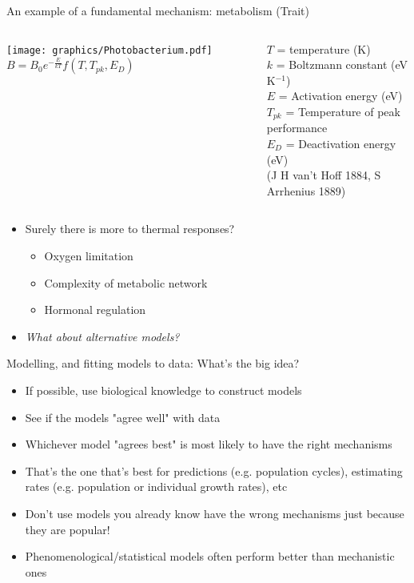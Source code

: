 \documentclass[xcolor=x11names,compress]{beamer}
\renewcommand{\(}{\begin{columns}}
\renewcommand{\)}{\end{columns}}
\newcommand{\<}[1]{\begin{column}{#1}}
\renewcommand{\>}{\end{column}}
\begin{document}
\begin{frame}{An example of a fundamental mechanism: metabolism (Trait)}
      
\begin{columns}[c]
  \column{2.1in}
    \pause
      \texttt{[image: graphics/Photobacterium.pdf]}
  \pause
  \column{2.7in}
    $B = B_0 \boxed {e^{-\frac{E}{kT}}}f(T,T_{pk},E_D)$\\
    \vspace{10pt}
    \raggedright{$T$ = temperature (K)\\
     $k$ = Boltzmann constant (eV K$^{-1}$)}\\
     $E$ = Activation energy (eV)\\
     $T_{pk}$ = Temperature of peak performance\\
     $E_D$ = Deactivation energy (eV)\\
    {\small (J H van't Hoff 1884, S Arrhenius 1889)}
\end{columns}

\begin{itemize}\setlength{\itemindent}{0em}
  \pause
  \item Surely there is more to thermal responses?
    \begin{itemize}\setlength{\itemindent}{-1em}
     \item Oxygen limitation
     \item Complexity of metabolic network
     \item Hormonal regulation
    \end{itemize}
    \pause
  \item \textit{What about alternative models?}\\

\end{itemize}
 
\end{frame}

\begin{frame}{Modelling, and fitting models to data: What's the big idea?}

\begin{itemize} \itemsep8pt

	\item If possible, use biological knowledge to construct models
	\item See if the models "agree well" with data
	\item Whichever model "agrees best" is most likely to have the right 
	mechanisms
	\item That's the one that's best for predictions (e.g. population 
	cycles), estimating rates (e.g. population or individual growth rates), etc
	\item Don't use models you already know have the wrong mechanisms just because they are popular!
	\item Phenomenological/statistical models often perform better than mechanistic ones

\end{itemize}
  
\end{frame}
\end{document}
